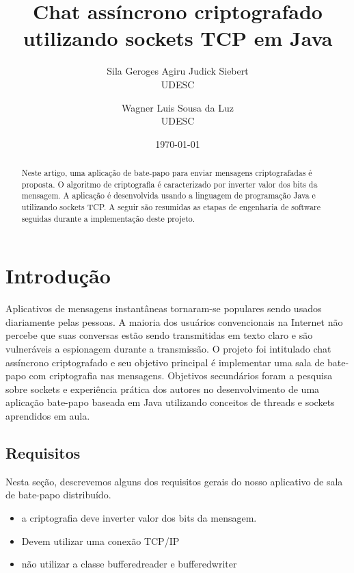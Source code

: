 \documentclass[a4paper,12pt]{article}
\title{Chat assíncrono criptografado utilizando  sockets TCP em Java}
\author{Sila Geroges Agiru Judick Siebert\\UDESC
        \and Wagner Luis Sousa da Luz \\UDESC}
\date{\today}
\begin{document}
\maketitle

\begin{abstract}
Neste artigo, uma aplicação de bate-papo para enviar mensagens  criptografadas é proposta.
O algoritmo de criptografia é caracterizado por inverter valor dos bits da mensagem. A aplicação é desenvolvida usando a linguagem de programação Java e utilizando sockets TCP. A seguir são resumidas as etapas de engenharia de software seguidas durante a implementação deste projeto.
\end{abstract}


\section{Introdução}
Aplicativos de mensagens instantâneas tornaram-se populares sendo usados diariamente pelas pessoas. A maioria dos usuários convencionais na Internet não percebe que suas conversas estão sendo transmitidas em texto claro e são vulneráveis a espionagem durante a transmissão.
O projeto foi intitulado  chat assíncrono criptografado e seu objetivo principal é implementar uma sala de bate-papo com criptografia nas mensagens. Objetivos secundários foram a pesquisa sobre sockets e experiência prática dos autores no desenvolvimento de uma aplicação bate-papo baseada em Java utilizando conceitos de threads e sockets aprendidos em aula.
\subsection{Requisitos}
Nesta seção, descrevemos alguns dos requisitos gerais
do nosso aplicativo de sala de bate-papo distribuído.
\begin{itemize}
\item a criptografia deve inverter valor dos bits da mensagem.
\item Devem utilizar uma conexão TCP/IP
\item não utilizar a classe bufferedreader e bufferedwriter
\end{itemize}
\end{document}
